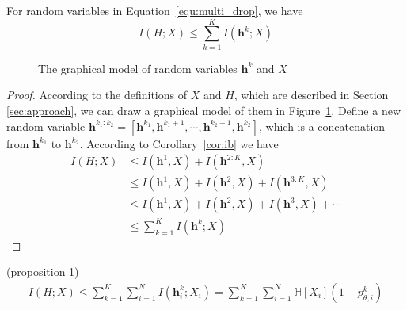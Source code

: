 \begin{theorem}
    For random variables in Equation~\ref{equ:multi_drop}, we have
    \begin{equation}
        I(H;X) \leq \sum_{k=1}^K I(\boldsymbol{h}^k; X)
    \end{equation}
\end{theorem}
\begin{figure}[H]
    \centering
    \caption{The graphical model of random variables $\boldsymbol{h}^k$ and $X$}
    \label{fig:graphical2}
\end{figure}

\begin{proof}
    According to the definitions of $X$ and $H$, which are described in Section \ref{sec:approach}, we can draw a graphical model of them in Figure~\ref{fig:graphical2}. Define a new random variable $\boldsymbol{h}^{k_1:k_2} = [\boldsymbol{h}^{k_1}, \boldsymbol{h}^{k_1+1}, \cdots, \boldsymbol{h}^{k_2-1}, \boldsymbol{h}^{k_2}]$, which is a concatenation from $\boldsymbol{h}^{k_1}$ to $\boldsymbol{h}^{k_2}$. According to Corollary~\ref{cor:ib} we have
    \begin{equation}
    \begin{aligned}
        I(H; X) &\leq I(\boldsymbol{h}^1, X) + I(\boldsymbol{h}^{2:K}, X)\\
        &\leq I(\boldsymbol{h}^1, X) + I(\boldsymbol{h}^2, X) + I(\boldsymbol{h}^{3:K}, X)\\
        &\leq I(\boldsymbol{h}^1, X) + I(\boldsymbol{h}^2, X) + I(\boldsymbol{h}^3, X) + \cdots \\
        &\leq \sum_{k=1}^K I(\boldsymbol{h}^k; X)
    \end{aligned}
    \end{equation}
\end{proof}

\begin{theorem} (proposition 1)
    \begin{equation}
            \begin{aligned}
        I(H; X)
        \leq \sum_{k=1}^K \sum_{i=1}^N
        I(\boldsymbol{h}^k_i; X_i)
        = \sum_{k=1}^K\sum_{i=1}^N \mathbb{H}[X_i] (1 - p^k_{\theta, i})
    \end{aligned}
    \end{equation}
\end{theorem}

